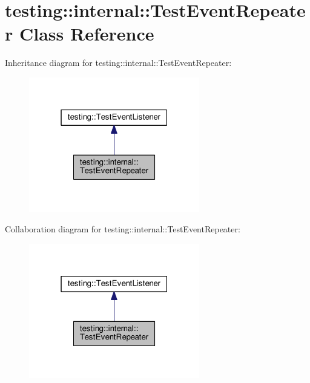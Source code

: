 \hypertarget{classtesting_1_1internal_1_1TestEventRepeater}{}\section{testing\+:\+:internal\+:\+:Test\+Event\+Repeater Class Reference}
\label{classtesting_1_1internal_1_1TestEventRepeater}


Inheritance diagram for testing\+:\+:internal\+:\+:Test\+Event\+Repeater\+:\nopagebreak
\begin{figure}[H]
\begin{center}
\leavevmode
\includegraphics[width=211pt]{classtesting_1_1internal_1_1TestEventRepeater__inherit__graph}
\end{center}
\end{figure}


Collaboration diagram for testing\+:\+:internal\+:\+:Test\+Event\+Repeater\+:\nopagebreak
\begin{figure}[H]
\begin{center}
\leavevmode
\includegraphics[width=211pt]{classtesting_1_1internal_1_1TestEventRepeater__coll__graph}
\end{center}
\end{figure}
